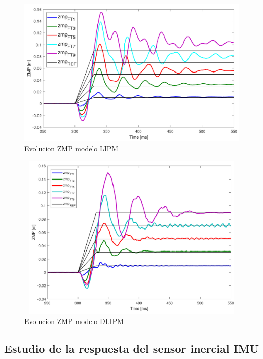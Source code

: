 \begin{figure}[H]
\centering
\includegraphics[scale=0.6]{imagenes/apartado_5/5.1/figura3.pdf}
\caption{Evolucion ZMP modelo LIPM}
\label{figura512}
\end{figure}




\begin{figure}[H]
\centering
\includegraphics[width=13cm, height=8cm]{imagenes/apartado_5/5.1/figura4.pdf}
\caption{Evolucion ZMP modelo DLIPM}
\label{figura55}
\end{figure}

\subsection{Estudio de la respuesta del sensor inercial IMU}\label{respuestaIMU}



\afterpage{\null\newpage}
\newpage
